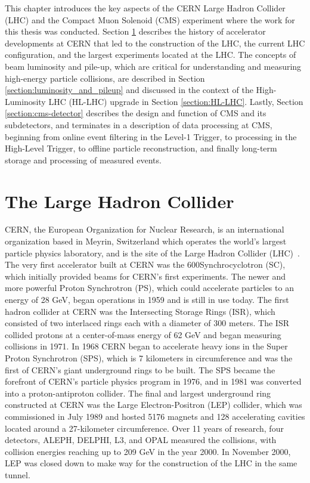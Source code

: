 This chapter introduces the key aspects of the CERN Large Hadron Collider (LHC) and the Compact Muon Solenoid (CMS) experiment where the work for this thesis was conducted. Section \ref{section:LHC} describes the history of accelerator developments at CERN that led to the construction of the LHC, the current LHC configuration, and the largest experiments located at the LHC. The concepts of beam luminosity and pile-up, which are critical for understanding and measuring high-energy particle collisions, are described in Section \ref{section:luminosity_and_pileup} and discussed in the context of the High-Luminosity LHC (HL-LHC) upgrade in Section \ref{section:HL-LHC}. Lastly, Section \ref{section:cms-detector} describes the design and function of CMS and its subdetectors, and terminates in a description of data processing at CMS, beginning from online event filtering in the Level-1 Trigger, to processing in the High-Level Trigger, to offline particle reconstruction, and finally long-term storage and processing of measured events.

\section{The Large Hadron Collider}
\label{section:LHC}
CERN, the European Organization for Nuclear Research, is an international organization based in Meyrin, Switzerland which operates the world's largest particle physics laboratory, and is the site of the Large Hadron Collider (LHC)~\cite{history_of_CERN}. The very first accelerator built at CERN was the 600\MeV Synchrocyclotron (SC), which initially provided beams for CERN's first experiments. The newer and more powerful Proton Synchrotron (PS), which could accelerate particles to an energy of 28 GeV, began operations in 1959 and is still in use today. The first hadron collider at CERN was the Intersecting Storage Rings (ISR), which consisted of two interlaced rings each with a diameter of 300 meters. The ISR collided protons at a center-of-mass energy of 62 GeV and began measuring collisions in 1971. In 1968 CERN began to accelerate heavy ions in the Super Proton Synchrotron (SPS), which is 7 kilometers in circumference and was the first of CERN's giant underground rings to be built. The SPS became the forefront of CERN's particle physics program in 1976, and in 1981 was converted into a proton-antiproton collider. The final and largest underground ring constructed at CERN was the Large Electron-Positron (LEP) collider, which was commissioned in July 1989 and hosted 5176 magnets and 128 accelerating cavities located around a 27-kilometer circumference. Over 11 years of research, four detectors, ALEPH, DELPHI, L3, and OPAL measured the collisions, with collision energies reaching up to 209 GeV in the year 2000. In November 2000, LEP was closed down to make way for the construction of the LHC in the same tunnel.

